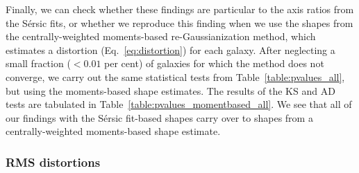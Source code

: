 \documentclass[twocolumn,useAMS,usenatbib]{mn2e}
\newcommand{\sersic}{S\'{e}rsic }
\begin{document}
Finally, we can check whether these findings are particular to the
axis ratios from the \sersic fits, or whether we reproduce this
finding when we use the shapes from the centrally-weighted
moments-based re-Gaussianization method, which estimates a distortion
(Eq.~\ref{eq:distortion}) for each galaxy. 
After neglecting a small fraction ($<0.01$ per cent) of galaxies for
which the method does not converge, 
we carry out the same statistical tests from
Table~\ref{table:pvalues_all}, but using the moments-based shape
estimates.  The results of the KS and AD tests are tabulated in Table~\ref{table:pvalues_momentbased_all}.
We see that all of our findings with the \sersic fit-based shapes
carry over to shapes from a centrally-weighted moments-based shape
estimate.

\subsubsection{RMS distortions}
\end{document}
